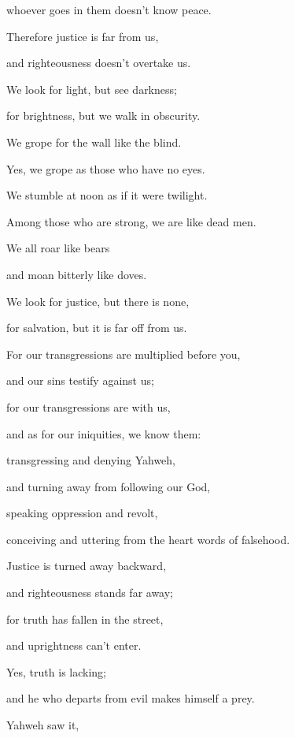 {\par }{\QB whoever goes in them doesn’t know peace.
\par }{\BB \par }{\Q {}Therefore justice is far from us,
\par }{\QB and righteousness doesn’t overtake us.
\par }{\Q We look for light, but see darkness;
\par }{\QB for brightness, but we walk in obscurity.
\par }{\Q {}We grope for the wall like the blind.
\par }{\QB Yes, we grope as those who have no eyes.
\par }{\Q We stumble at noon as if it were twilight.
\par }{\QB Among those who are strong, we are like dead men.
\par }{\Q {}We all roar like bears
\par }{\QB and moan bitterly like doves.
\par }{\Q We look for justice, but there is none,
\par }{\QB for salvation, but it is far off from us.
\par }{\BB \par }{\Q {}For our transgressions are multiplied before you,
\par }{\QB and our sins testify against us;
\par }{\Q for our transgressions are with us,
\par }{\QB and as for our iniquities, we know them:
\par }{\Q {}transgressing and denying Yahweh,
\par }{\QB and turning away from following our God,
\par }{\QB speaking oppression and revolt,
\par }{\QB conceiving and uttering from the heart words of falsehood.
\par }{\Q {}Justice is turned away backward,
\par }{\QB and righteousness stands far away;
\par }{\Q for truth has fallen in the street,
\par }{\QB and uprightness can’t enter.
\par }{\Q {}Yes, truth is lacking;
\par }{\QB and he who departs from evil makes himself a prey.
\par }{\BB \par }{\Q Yahweh saw it,
}
